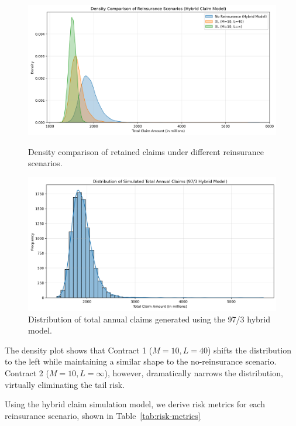 \documentclass[8pt]{article}
\begin{document}
\begin{figure}[h]
    \centering
    \begin{minipage}{0.48\textwidth}
        \centering        \includegraphics[width=\linewidth]{Figures/reinsurance_density.png}
        \caption{Density comparison of retained claims under different reinsurance scenarios.}
        \label{fig:reinsurance-density}
    \end{minipage}
    \hfill
    \begin{minipage}{0.48\textwidth}
        \centering
        \includegraphics[width=\linewidth]{Figures/total_claims_distribution.png}
        \caption{Distribution of total annual claims generated using the 97/3 hybrid model.}
        \label{fig:total-claims-dist}
    \end{minipage}
\end{figure}

The density plot shows that Contract 1 ($M=10, L=40$) shifts the distribution to the left while maintaining a similar shape to the no-reinsurance scenario. Contract 2 ($M=10, L=\infty$), however, dramatically narrows the distribution, virtually eliminating the tail risk.

Using the hybrid claim simulation model, we derive risk metrics for each reinsurance scenario, shown in Table~\ref{tab:risk-metrics}
\end{document}
